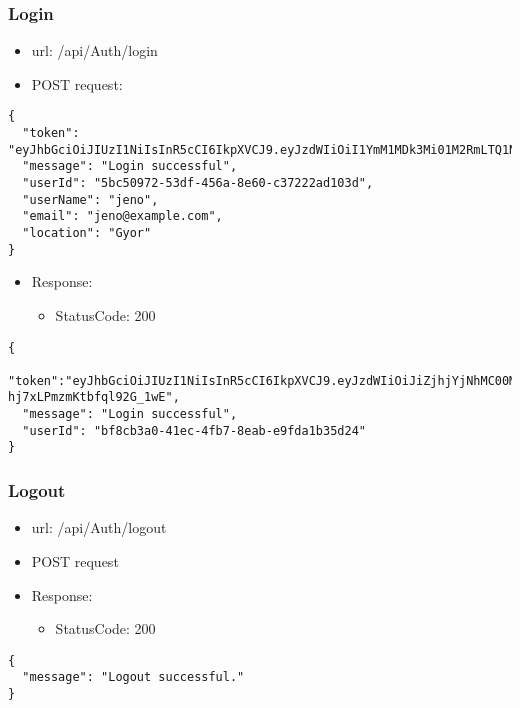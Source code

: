 \documentclass[11pt]{article}
\begin{document}
\subsubsection{Login}
\label{sec:org05e8901}
\begin{itemize}
\item url: /api/Auth/login
\item POST request:
\end{itemize}
\begin{verbatim}
{
  "token": "eyJhbGciOiJIUzI1NiIsInR5cCI6IkpXVCJ9.eyJzdWIiOiI1YmM1MDk3Mi01M2RmLTQ1NmEtOGU2MC1jMzcyMjJhZDEwM2QiLCJlbWFpbCI6Implbm9AZXhhbXBsZS5jb20iLCJ1bmlxdWVfbmFtZSI6Implbm8iLCJsb2NhdGlvbiI6Ikd5b3IiLCJodHRwOi8vc2NoZW1hcy5taWNyb3NvZnQuY29tL3dzLzIwMDgvMDYvaWRlbnRpdHkvY2xhaW1zL3JvbGUiOiJVc2VyIiwiZXhwIjoxNzQ1OTE3MjUyLCJpc3MiOiJodHRwczovL3VuaXBvaW50LWI2aDZoNGN1Ym5jbWFmaGgucG9sYW5kY2VudHJhbC0wMS5henVyZXdlYnNpdGVzLm5ldCIsImF1ZCI6Imh0dHBzOi8vdW5pcG9pbnQtYjZoNmg0Y3VibmNtYWZoaC5wb2xhbmRjZW50cmFsLTAxLmF6dXJld2Vic2l0ZXMubmV0In0.pSL_OrSHcPK8fZqlmHTtLBclXwlL4o7wyKBwgEkjIho",
  "message": "Login successful",
  "userId": "5bc50972-53df-456a-8e60-c37222ad103d",
  "userName": "jeno",
  "email": "jeno@example.com",
  "location": "Gyor"
}
\end{verbatim}
\begin{itemize}
\item Response:
\begin{itemize}
\item StatusCode: 200
\end{itemize}
\end{itemize}
\begin{verbatim}
{
  "token":"eyJhbGciOiJIUzI1NiIsInR5cCI6IkpXVCJ9.eyJzdWIiOiJiZjhjYjNhMC00MWVjLTRmYjctOGVhYi1lOWZkYTFiMzVkMjQiLCJlbWFpbCI6Implbm9AZXhhbXBsZS5jb20iLCJ1bmlxdWVfbmFtZSI6Implbm8iLCJodHRwOi8vc2NoZW1hcy5taWNyb3NvZnQuY29tL3dzLzIwMDgvMDYvaWRlbnRpdHkvY2xhaW1zL3JvbGUiOiJVc2VyIiwiZXhwIjoxNzQxMzQ5MTgxLCJpc3MiOiJodHRwczovL2xvY2FsaG9zdDo1MDAxIiwiYXVkIjoiaHR0cHM6Ly9sb2NhbGhvc3Q6NTAwMSJ9.rc1SfKdnQCIqoZpdTbDq-hj7xLPmzmKtbfql92G_1wE",
  "message": "Login successful",
  "userId": "bf8cb3a0-41ec-4fb7-8eab-e9fda1b35d24"
}
\end{verbatim}
\subsubsection{Logout}
\label{sec:org2e06d77}
\begin{itemize}
\item url: /api/Auth/logout
\item POST request
\item Response:
\begin{itemize}
\item StatusCode: 200
\end{itemize}
\end{itemize}
\begin{verbatim}
{
  "message": "Logout successful."
}
\end{verbatim}
\end{document}
